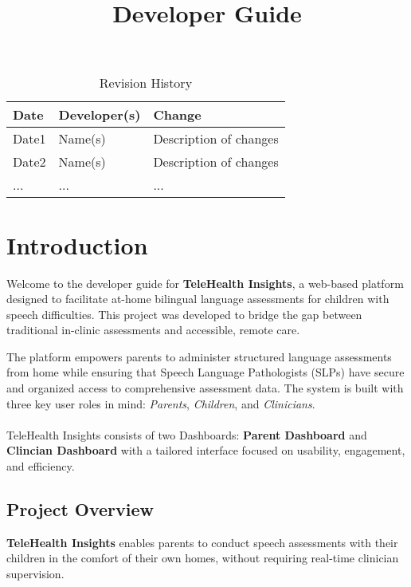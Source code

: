 \documentclass{article}
\title{Developer Guide\\\progname}
\author{\authname}
\date{}
\begin{document}
\maketitle
\newpage

\begin{table}[h!]
\caption{Revision History} \label{TblRevisionHistory}
\begin{tabularx}{\textwidth}{llX}
\toprule
\textbf{Date} & \textbf{Developer(s)} & \textbf{Change}\\
\midrule
Date1 & Name(s) & Description of changes\\
Date2 & Name(s) & Description of changes\\
... & ... & ...\\
\bottomrule
\end{tabularx}
\end{table}

\newpage


\tableofcontents

\section{Introduction}

Welcome to the developer guide for \textbf{TeleHealth Insights}, a web-based platform designed to facilitate at-home bilingual language assessments for children with speech difficulties. This project was developed to bridge the gap between traditional in-clinic assessments and accessible, remote care. 

The platform empowers parents to administer structured language assessments from home while ensuring that Speech Language Pathologists (SLPs) have secure and organized access to comprehensive assessment data. 
The system is built with three key user roles in mind: \textit{Parents}, \textit{Children}, and \textit{Clinicians}. \\\\
TeleHealth Insights consists of two Dashboards:  \textbf{Parent Dashboard} and  \textbf{Clincian Dashboard} with a tailored interface focused on usability, engagement, and efficiency.

\subsection{Project Overview}

\textbf{TeleHealth Insights} enables parents to conduct speech assessments with their children in the comfort of their own homes, without requiring real-time clinician supervision.
\end{document}
